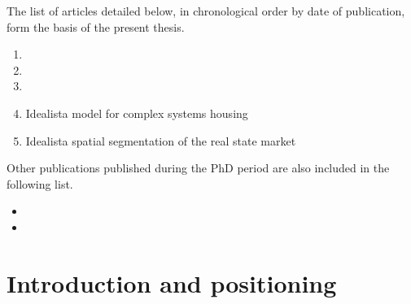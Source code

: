 \documentclass[
	10pt, %
	a4paper,
]{LegrandOrangeBook}
\begin{document}
The list of articles detailed below, in chronological order by date of publication, form the basis of the present thesis.
\vspace{0.5 cm}

\begin{enumerate}
	\item {}
	\vspace{0.5 cm}
	\item {}
	\vspace{0.5 cm}
	\item {}
	\vspace{0.5 cm}
	\item Idealista model for complex systems housing
	\vspace{0.5 cm}
	\item Idealista spatial segmentation of the real state market
	\vspace{0.5 cm}
\end{enumerate}

\vspace{0.5 cm}
Other publications published during the PhD period are also included in the following list.

\vspace{0.5 cm}
\begin{itemize}
	\item {}
	\vspace{0.5 cm}
	\item {}
	\vspace{0.5 cm}
\end{itemize}

\chapterspaceabove{6.75cm}
\chapterspacebelow{7.25cm}

\chapter{Introduction and positioning}


\chapterspaceabove{6.75cm}
\chapterspacebelow{7.25cm}
\end{document}
